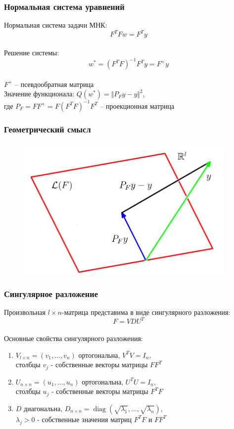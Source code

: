 \documentclass[10pt]{beamer}
\begin{document}
\begin{frame}\frametitle{Нормальная система уравнений}
	Нормальная система задачи МНК:
	$$F^TFw = F^Ty$$\\
	Решение системы:\\
	$$w^* = (F^TF)^{-1}F^Ty = F^+y$$\\
	$F^+$ -- псевдообратная матрица\\
	\bigbreak
	Значение функционала: $Q(w^*) = \Vert P_F y - y \Vert^2$,\\
	где $P_F = FF^+ = F(F^TF)^{-1}F^T$ -- проекционная матрица
\end{frame}

\begin{frame}\frametitle{Геометрический смысл}
	\begin{figure}[htbp]
	  \includegraphics[height=200pt, keepaspectratio = true]{images/geometry}   
	\end{figure}
\end{frame}

\begin{frame}\frametitle{Сингулярное разложение}
	Произвольная $l \times n$-матрица представима в виде сингулярного разложения:\\
	$$F = VDU^T$$\\
	Основные свойства сингулярного разложения:\\
	\begin{enumerate}[--]
		\item $V_{l \times n} = (v_1, \dots, v_n)$ ортогональна, $V^TV = I_n$, \\столбцы $v_j$ - собственные векторы матрицы $FF^T$
		\item $U_{n \times n} = (u_1, \dots, u_n)$ ортогональна, $U^TU = I_n$, \\столбцы $u_j$ - собственные векторы матрицы $F^TF$
		\item $D$ диагональна, $D_{n \times n} = \operatorname{diag} (\sqrt{\lambda_1}, \dots, \sqrt{\lambda_n})$, \\$\lambda_j > 0$ - собственные значения матриц $F^TF$ и $FF^T$
	\end{enumerate}
\end{frame}
\end{document}
